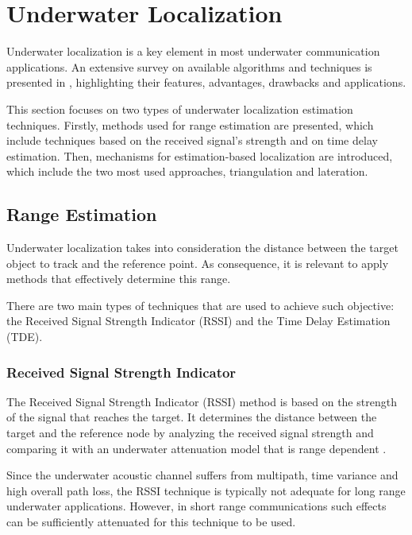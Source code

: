 
\section{Underwater Localization}

Underwater localization is a key element in most underwater communication applications. An extensive survey on available algorithms and techniques is presented in \cite{und-localiz-survey}, highlighting their features, advantages, drawbacks and applications.

This section focuses on two types of underwater localization estimation techniques. Firstly, methods used for range estimation are presented, which include techniques based on the received signal's strength and on time delay estimation. Then, mechanisms for estimation-based localization are introduced, which include the two most used approaches, triangulation and lateration.

\subsection{Range Estimation}

Underwater localization takes into consideration the distance between the target object to track and the reference point. As consequence, it is relevant to apply methods that effectively determine this range.

There are two main types of techniques that are used to achieve such objective: the Received Signal Strength Indicator (RSSI) and the Time Delay Estimation (TDE).

\subsubsection{Received Signal Strength Indicator}

The Received Signal Strength Indicator (RSSI) method is based on the strength of the signal that reaches the target. It determines the distance between the target and the reference node by analyzing the received signal strength and comparing it with an underwater attenuation model that is range dependent \cite{ocean-acoust}.

Since the underwater acoustic channel suffers from multipath, time variance and high overall path loss, the RSSI technique is typically not adequate for long range underwater applications. However, in short range communications such effects can be sufficiently attenuated for this technique to be used.

